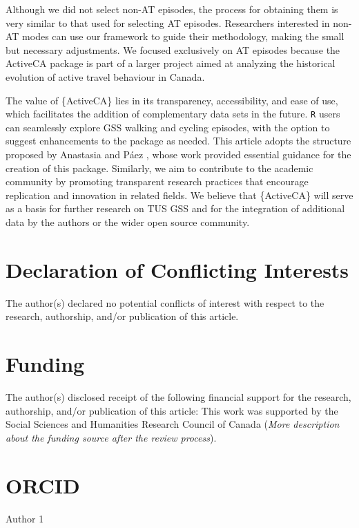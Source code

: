 \documentclass[Royal,times,sageh]{sagej}
\begin{document}
Although we did not select non-AT episodes, the process for obtaining
them is very similar to that used for selecting AT episodes. Researchers
interested in non-AT modes can use our framework to guide their
methodology, making the small but necessary adjustments. We focused
exclusively on AT episodes because the ActiveCA package is part of a
larger project aimed at analyzing the historical evolution of active
travel behaviour in Canada.

The value of \{ActiveCA\} lies in its transparency, accessibility, and
ease of use, which facilitates the addition of complementary data sets
in the future. \texttt{R} users can seamlessly explore GSS walking and
cycling episodes, with the option to suggest enhancements to the package
as needed. This article adopts the structure proposed by Anastasia and
Páez \citeyearpar{soukhov2023}, whose work provided essential guidance
for the creation of this package. Similarly, we aim to contribute to the
academic community by promoting transparent research practices that
encourage replication and innovation in related fields. We believe that
\{ActiveCA\} will serve as a basis for further research on TUS GSS and
for the integration of additional data by the authors or the wider open
source community.

\section{Declaration of Conflicting
Interests}\label{declaration-of-conflicting-interests}

The author(s) declared no potential conflicts of interest with respect
to the research, authorship, and/or publication of this article.

\section{Funding}\label{funding}

The author(s) disclosed receipt of the following financial support for
the research, authorship, and/or publication of this article: This work
was supported by the Social Sciences and Humanities Research Council of
Canada (\emph{More description about the funding source after the review
process}).

\section{ORCID}\label{orcid}

Author 1
\end{document}

